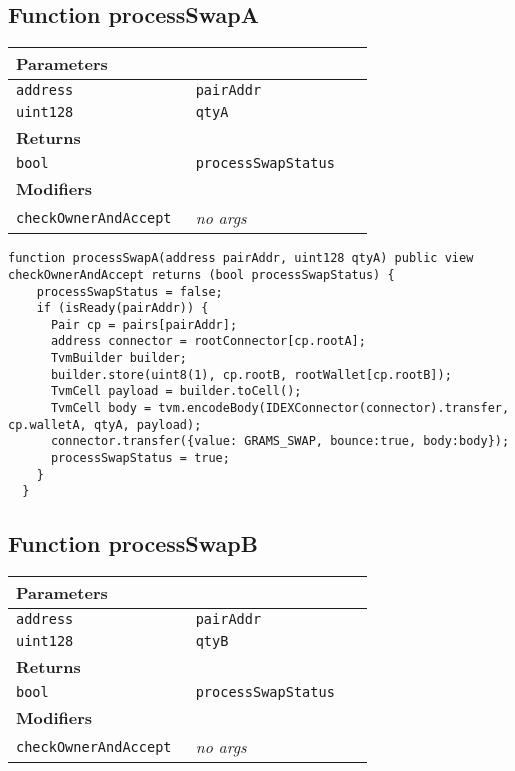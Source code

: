 \subsection{Function processSwapA}


\ifsoltables
\noindent\begin{tabular}{|l|l|p{5cm}|}\hline
\multicolumn{3}{|l|}{\bf Parameters}\\\hline
\tt address & \tt pairAddr &\\\hline
\tt uint128 & \tt qtyA &\\\hline
\multicolumn{3}{|l|}{\bf Returns}\\\hline
\tt bool & \tt processSwapStatus &\\\hline
\multicolumn{3}{|l|}{\bf Modifiers}\\\hline
\tt checkOwnerAndAccept & {\em no args} &\\\hline
\end{tabular}
\fi

\vspace{2cm}

\begin{lstlisting}[firstnumber=221]
  function processSwapA(address pairAddr, uint128 qtyA) public view checkOwnerAndAccept returns (bool processSwapStatus) {
    processSwapStatus = false;
    if (isReady(pairAddr)) {
      Pair cp = pairs[pairAddr];
      address connector = rootConnector[cp.rootA];
      TvmBuilder builder;
      builder.store(uint8(1), cp.rootB, rootWallet[cp.rootB]);
      TvmCell payload = builder.toCell();
      TvmCell body = tvm.encodeBody(IDEXConnector(connector).transfer, cp.walletA, qtyA, payload);
      connector.transfer({value: GRAMS_SWAP, bounce:true, body:body});
      processSwapStatus = true;
    }
  }
\end{lstlisting}

\subsection{Function processSwapB}


\ifsoltables
\noindent\begin{tabular}{|l|l|p{5cm}|}\hline
\multicolumn{3}{|l|}{\bf Parameters}\\\hline
\tt address & \tt pairAddr &\\\hline
\tt uint128 & \tt qtyB &\\\hline
\multicolumn{3}{|l|}{\bf Returns}\\\hline
\tt bool & \tt processSwapStatus &\\\hline
\multicolumn{3}{|l|}{\bf Modifiers}\\\hline
\tt checkOwnerAndAccept & {\em no args} &\\\hline
\end{tabular}
\fi

